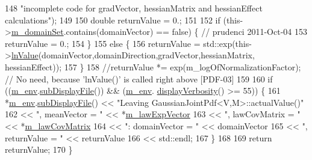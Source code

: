 \begin{DoxyCode}
148                       \textcolor{stringliteral}{"incomplete code for gradVector, hessianMatrix and hessianEffect calculations"});
149 
150   \textcolor{keywordtype}{double} returnValue = 0.;
151 
152   \textcolor{keywordflow}{if} (this->\hyperlink{class_q_u_e_s_o_1_1_base_scalar_function_a67696e86211197938c72cd11863f5cf8}{m\_domainSet}.contains(domainVector) == \textcolor{keyword}{false}) \{ \textcolor{comment}{// prudenci 2011-Oct-04}
153     returnValue = 0.;
154   \}
155   \textcolor{keywordflow}{else} \{
156     returnValue = std::exp(this->\hyperlink{class_q_u_e_s_o_1_1_gaussian_joint_pdf_a14207045679234c5112974be5445b30d}{lnValue}(domainVector,domainDirection,gradVector,hessianMatrix,
      hessianEffect));
157   \}
158   \textcolor{comment}{//returnValue *= exp(m\_logOfNormalizationFactor); // No need, because 'lnValue()' is called right above
       [PDF-03]}
159 
160   \textcolor{keywordflow}{if} ((\hyperlink{class_q_u_e_s_o_1_1_base_scalar_function_adf44141aeb765d97613286f88f235f04}{m\_env}.\hyperlink{class_q_u_e_s_o_1_1_base_environment_a8a0064746ae8dddfece4229b9ad374d6}{subDisplayFile}()) && (\hyperlink{class_q_u_e_s_o_1_1_base_scalar_function_adf44141aeb765d97613286f88f235f04}{m\_env}.
      \hyperlink{class_q_u_e_s_o_1_1_base_environment_a1fe5f244fc0316a0ab3e37463f108b96}{displayVerbosity}() >= 55)) \{
161     *\hyperlink{class_q_u_e_s_o_1_1_base_scalar_function_adf44141aeb765d97613286f88f235f04}{m\_env}.\hyperlink{class_q_u_e_s_o_1_1_base_environment_a8a0064746ae8dddfece4229b9ad374d6}{subDisplayFile}() << \textcolor{stringliteral}{"Leaving GaussianJointPdf<V,M>::actualValue()"}
162                             << \textcolor{stringliteral}{", meanVector = "}   << *\hyperlink{class_q_u_e_s_o_1_1_gaussian_joint_pdf_a8ef2407f5234ce5e0ed0d05a21f183e5}{m\_lawExpVector}
163                       << \textcolor{stringliteral}{", lawCovMatrix = "} << *\hyperlink{class_q_u_e_s_o_1_1_gaussian_joint_pdf_af13b72027783d8db03721951a71087d8}{m\_lawCovMatrix}
164                             << \textcolor{stringliteral}{": domainVector = "} << domainVector
165                             << \textcolor{stringliteral}{", returnValue = "}  << returnValue
166                             << std::endl;
167   \}
168 
169   \textcolor{keywordflow}{return} returnValue;
170 \}
\end{DoxyCode}
